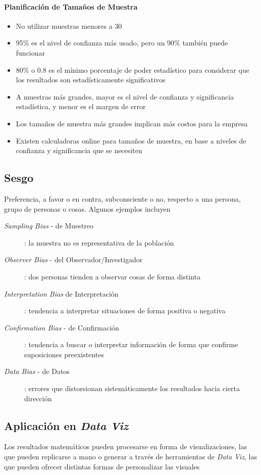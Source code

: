 \paragraph{Planificación de Tamaños de Muestra}
\begin{itemize}
    \item {No utilizar muestras menores a 30}
    \item {95\% es el nivel de confianza más usado, pero un 90\% también puede funcionar}
    \item {80\% o 0.8 es el mínimo porcentaje de poder estadístico para considerar que los resultados son estadísticamente significativos}
    \item {A muestras más grandes, mayor es el nivel de confianza y significancia estadística, y menor es el margen de error}
    \item {Los tamaños de muestra más grandes implican más costos para la empresa}
    \item {Existen calculadoras online para tamaños de muestra, en base a niveles de confianza y significancia que se necesiten}
\end{itemize}

\subsection{Sesgo}
Preferencia, a favor o en contra, subconsciente o no, respecto a una persona, grupo de personas o cosas. Algunos ejemplos incluyen 
    \begin{description}
        \item [\textit{Sampling Bias} - de Muestreo]{ :  la muestra no es representativa de la población}
        \item [\textit{Observer Bias} - del Observador/Investigador]{ : dos personas tienden a observar cosas de forma distinta}
        \item [\textit{Interpretation Bias} de Interpretación]{ : tendencia a interpretar situaciones de forma positiva o negativa}
        \item [\textit{Confirmation Bias} - de Confirmación]{ : tendencia a buscar o interpretar información de forma que confirme suposiciones preexistentes}
        \item [\textit{Data Bias} - de Datos]{ : errores que distorsionan sistemáticamente los resultados hacia cierta dirección}
    \end{description}

\subsection{Aplicación en \textit{Data Viz}}
Los resultados matemáticos pueden procesarse en forma de visualizaciones, las que pueden replicarse a mano o generar a través de herramientas de \textit{Data Viz}, las que pueden ofrecer distintas formas de personalizar las visuales

